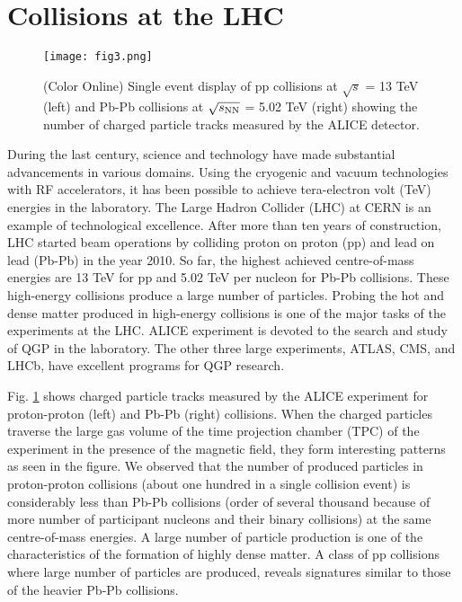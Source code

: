 \documentclass[showpacs,showkeys,aps,twocolumn]{revtex4}
\newcommand\+{\dagger}
\begin{document}
 \section{Collisions at the LHC}
\label{section4}
\begin{figure}[ht]
\texttt{[image: fig3.png]}
\caption[]{(Color Online) Single event display of pp collisions at $\sqrt{s}$ = 13 TeV (left) and Pb-Pb collisions at 
$\sqrt{s_{\rm NN}}$ = 5.02 TeV (right) showing the number of charged particle tracks measured by the ALICE detector.}
\label{fig3}
\end{figure}

During the last century, science and technology have made substantial advancements in various domains. Using the cryogenic and vacuum technologies with RF accelerators, it has been possible to achieve tera-electron volt (TeV) energies in the laboratory. The Large Hadron Collider (LHC) at CERN is an example of technological excellence. After more than ten years of construction, LHC started beam operations by colliding proton on proton (pp) and lead on lead (Pb-Pb) in the year 2010. So far, the highest achieved centre-of-mass energies are 13 TeV for pp and 5.02 TeV per nucleon for Pb-Pb collisions. These high-energy collisions produce a large number of particles. Probing the hot and dense matter produced in high-energy collisions is one of the major tasks of the experiments at the LHC. ALICE experiment is devoted to the search and study of QGP in the laboratory. The other three large experiments, ATLAS, CMS, and LHCb, have excellent programs for QGP research.

Fig. \ref{fig3} shows charged particle tracks measured by the ALICE experiment for proton-proton (left) and Pb-Pb (right) collisions. When the charged particles traverse the large gas volume of the time projection chamber (TPC) of the experiment in the presence of the magnetic field, they form interesting patterns as seen in the figure. We observed that the number of produced particles in proton-proton collisions (about one hundred in a single collision event) is considerably less than Pb-Pb collisions (order of several thousand because of more number of participant nucleons and their binary collisions) at the same centre-of-mass energies. A large number of particle production is one of the characteristics of the formation of highly dense matter. A class of pp collisions where large number of particles are produced, reveals signatures similar to those of the heavier Pb-Pb collisions.
\end{document}
